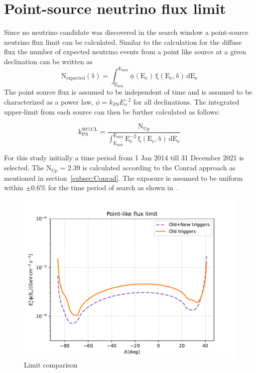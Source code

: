\section{Point-source neutrino flux limit}
\label{sec:pfux_limit}
Since no neutrino candidate was discovered in the search window a point-source neutrino flux limit can be calculated. Similar to the calculation for the diffuse flux the number of expected neutrino events from a point like source at a given declination can be written as 
\begin{equation}
  \mathrm{N_{expected}(\delta) = \int_{E_{min}}^{E_{max}}  \phi(E_{\nu}) \, \xi(E_{\nu}, \delta) \, dE_{\nu}}
\end{equation}
The point source flux is assumed to be independent of time and is assumed to be characterized as a power law, $\phi = k_{PS} E_{\nu}^{-2}$ for all declinations. The integrated upper-limit from each source can then be further calculated as follows:

\begin{equation}
  \label{eq:point_flux_limit}
  \mathrm{k_{PS}^{90\%CL} = \frac{N_{Up}}{\int_{E_{min}}^{E_{max}} E_{\nu}^{-2} \, \xi(E_{\nu}, \delta) \, dE_{\nu}}}
\end{equation}

For this study initially a time period from 1 Jan 2014 till 31 December 2021 is selected. The N$_{Up}$ = 2.39 is calculated according to the Conrad approach as mentioned in section~\ref{subsec:Conrad}. The exposure is assumed to be uniform within $\pm 0.6\%$ for the time period of search as shown in~\cite{PierreAuger:2017pzq}. 


\begin{figure}[t!]
  \centering
  \includegraphics[width=14.5cm]{thesis_figures/PointLimits/Point_comp_new_old.pdf}
  \caption{Limit comparison}
  \label{fig:Dec_limit_new old}
\end{figure}

